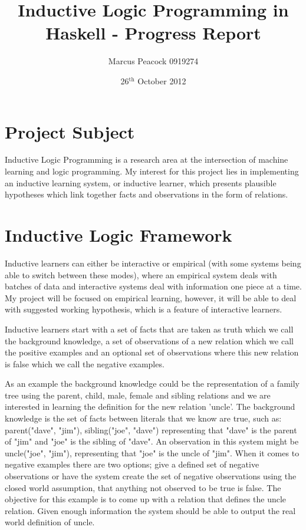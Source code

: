 \documentclass{article}
\title{Inductive Logic Programming in Haskell - Progress Report}
\author{Marcus Peacock 0919274}
\date{26$^{\textrm{th}}$ October 2012}
\begin{document}
\maketitle

\section*{Project Subject}

Inductive Logic Programming is a research area at the intersection of machine
learning and logic programming. My interest for this project lies in
implementing an inductive learning system, or inductive learner, which presents plausible hypotheses which link together facts and observations in the form of relations.

\section*{Inductive Logic Framework}

Inductive learners can either be interactive or empirical (with some systems
being able to switch between these modes), where an empirical system deals with
batches of data and interactive systems deal with information one piece at a
time. My project will be focused on empirical learning, however, it will be
able to deal with suggested working hypothesis, which is a feature of
interactive learners.

Inductive learners start with a set of facts that are taken as truth which we
call the background knowledge, a set of observations of a new relation which we
call the positive examples and an optional set of observations where this new
relation is false which we call the negative examples.

As an example the background knowledge could be
the representation of a family tree using the parent, child, male, female and sibling
relations and we are interested in learning the definition for the new relation
'uncle'. The background knowledge is the set of facts between literals that we
know are true, such as: parent("dave", "jim"), sibling("joe", "dave")
representing that "dave" is the parent of "jim" and "joe" is the sibling of
"dave". An observation in this system might be uncle("joe", "jim"),
    representing that "joe" is the uncle of "jim". When it comes to negative
    examples there are two options; give a defined set of negative observations
    or have the system create the set of negative observations using the closed
    world assumption, that anything not observed to be true is false. The
    objective for this example is to come up with a relation that defines the
    uncle relation. Given enough information the system should be able to
    output the real world definition of uncle.
\end{document}
